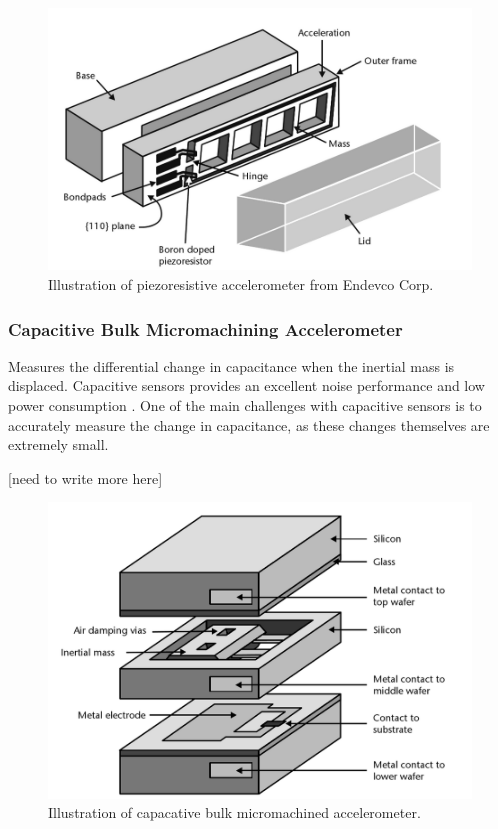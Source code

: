 \begin{figure}[h]
\centering
\includegraphics[scale=0.3]{fig/piezoresistive.png}
\caption{Illustration of piezoresistive accelerometer from Endevco Corp. \cite[p.~98]{maluf04}}
\label{fig:piezoresistive_accel}
\end{figure}

\subsubsection{Capacitive Bulk Micromachining Accelerometer}

Measures the differential change in capacitance when the inertial mass is displaced. Capacitive sensors provides an excellent noise performance and low power consumption \cite[p.~91]{kaajakari09}. One of the main challenges with capacitive sensors is to accurately measure the change in capacitance, as these changes themselves are extremely small. 

[need to write more here]

\begin{figure}[h]
\centering
\includegraphics[scale=0.3]{fig/bulk_micromachined.png}
\caption{Illustration of capacative bulk micromachined accelerometer. \cite[p.~100]{maluf04}}
\label{fig:bulk_micromachined}
\end{figure}

